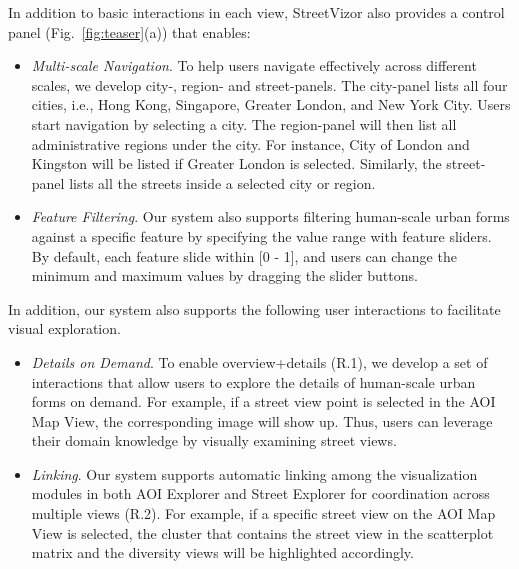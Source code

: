 In addition to basic interactions in each view, StreetVizor also provides a control panel (Fig.~\ref{fig:teaser}(a)) that enables:

\begin{itemize}

\vspace*{-1mm}
\item
\textit{Multi-scale Navigation}.
To help users navigate effectively across different scales, we develop city-, region- and street-panels.
The city-panel lists all four cities, i.e., Hong Kong, Singapore, Greater London, and New York City.
Users start navigation by selecting a city. 
The region-panel will then list all administrative regions under the city.
For instance, City of London and Kingston will be listed if Greater London is selected.
Similarly, the street-panel lists all the streets inside a selected city or region.

\vspace*{-1mm}
\item
\textit{Feature Filtering}.
Our system also supports filtering human-scale urban forms against a specific feature by specifying the value range with feature sliders. 
By default, each feature slide within [0 - 1], and users can change the minimum and maximum values by dragging the slider buttons.

\end{itemize}

In addition, our system also supports the following user interactions to facilitate visual exploration.
\begin{itemize}

\vspace*{-1mm}
\item
\textit{Details on Demand}.
To enable overview+details (R.1), we develop a set of interactions that allow users to explore the details of human-scale urban forms on demand.
For example, if a street view point is selected in the AOI Map View, the corresponding image will show up.
Thus, users can leverage their domain knowledge by visually examining street views.

\vspace*{-1mm}
\item
\textit{Linking}.
Our system supports automatic linking among the visualization modules in both AOI Explorer and Street Explorer for coordination across multiple views (R.2).
For example, if a specific street view on the AOI Map View is selected, the cluster that contains the street view in the scatterplot matrix and the diversity views will be highlighted accordingly.

\end{itemize}